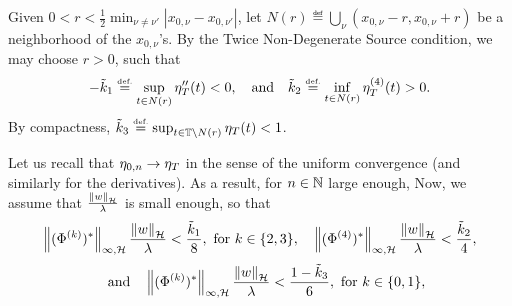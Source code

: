 Given $0<r<\frac{1}{2}\min_{\nu\neq \nu'}|x_{0,\nu}-x_{0,\nu'}|$, let $N(r)\eqdef\bigcup_{\nu}(x_{0,\nu}-r,x_{0,\nu}+r)$ be a neighborhood of the $x_{0,\nu}$'s. By the Twice Non-Degenerate Source condition, we may choose $r>0$, such that
\begin{align*}
  -\tilde{k}_1\stackrel{\mbox{\upshape\tiny def.}}{=} \sup_{t\in N(r)}\eta_T''(t)< 0,\quad \text{and} \quad  \tilde{k}_{2}\stackrel{\mbox{\upshape\tiny def.}}{=} \inf_{t\in N(r)}\eta_T^{(4)}(t)>0.
\end{align*}
By compactness, $\tilde{k}_3\stackrel{\mbox{\upshape\tiny def.}}{=} \sup_{t\in\mathbb{T}\setminus N(r)}\eta_T(t)<1$.

Let us recall that $\eta_{0,n}\to \eta_T$ in the sense of the uniform convergence (and similarly for the derivatives). As a result, for $n\in\mathbb{N}$ large enough, 
Now, we assume that $\frac{\left\lVert w \right\rVert_{\mathcal{H}}}{\lambda}$ is small enough, so that 
\begin{align*}
  \left\lVert (\Phi^{(k)})^* \right\rVert_{\infty,\mathcal{H}}\frac{\left\lVert w \right\rVert_{\mathcal{H}}}{\lambda} <\frac{\tilde{k}_1}{8}, 
  \mbox{ for } k\in\{2,3\}, \quad  
  \left\lVert (\Phi^{(4)})^* \right\rVert_{\infty,\mathcal{H}}\frac{\left\lVert w \right\rVert_{\mathcal{H}}}{\lambda} <\frac{\tilde{k}_2}{4},
\end{align*}
\begin{align}
	\quad \text{and} \quad  \left\lVert (\Phi^{(k)})^* \right\rVert_{\infty,\mathcal{H}}\frac{\left\lVert w \right\rVert_{\mathcal{H}}}{\lambda} <\frac{1-\tilde{k}_3}{6}, 
	\mbox{ for } k\in\{0,1\},\label{eq-cbp-const-noise}
\end{align}

